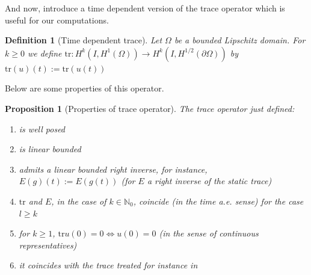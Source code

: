 \documentclass[english,a4paper,12pt,oneside]{scrbook}
\theoremstyle{break}
\newtheorem{defn}[equation]{Definition}
\newtheorem{prop}[equation]{Proposition}
\theoremstyle{remark}
\newcommand{\tr}{\text{tr}}
\begin{document}
And now, introduce a time dependent version of the trace operator which is useful for our computations.

\begin{defn}[Time dependent trace]
Let $\Omega$ be a bounded Lipschitz domain. For $k\geq 0$ we define $\tr: H^k(I,H^1(\Omega))\rightarrow H^k(I, H^{1/2} (\partial \Omega))$ by $\tr(u)(t):=\tr(u(t))$
\end{defn}

Below are some properties of this operator.

\begin{prop}[Properties of trace operator]
\label{prop:trace}
The trace operator just defined:
\begin{enumerate}
\item is well posed
\item is linear bounded
\item admits a linear bounded right inverse, for instance, $E(g)(t):=E(g(t))$ (for $E$ a right inverse of the static trace)
\item $\tr$ and $E$, in the case of $k \in \mathbb{N}_0$, coincide (in the time a.e. sense) for the case $l\geq k$
\item for $k\geq 1$, $\tr u(0)=0 \iff u(0)=0$ (in the sense of continuous representatives)
\item it coincides with the trace treated for instance in \cite{lions}
\end{enumerate}
\end{prop}
\end{document}
